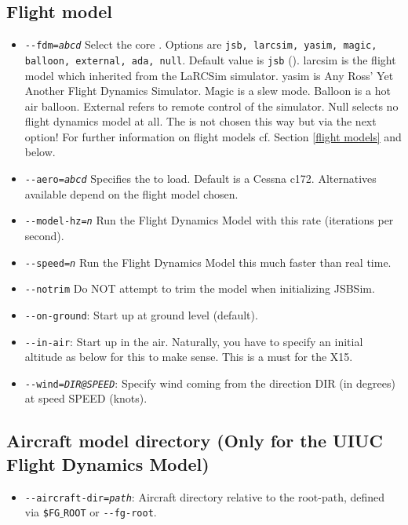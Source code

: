 \subsection{Flight model}\label{flight dynamics model}
\begin{itemize}
\item{\texttt{-$ $-fdm={\it abcd}}} Select the core .
Options are \texttt{jsb, larcsim, yasim, magic, balloon, external, ada, null}. Default value is
\texttt{jsb} (\JSBSim). larcsim is the flight model which \FlightGear{} inherited from the LaRCSim simulator. yasim is Any Ross' Yet Another Flight Dynamics Simulator. Magic is a slew mode. Balloon is a hot air balloon. External refers to remote control of the simulator. Null selects no flight dynamics model at all. The  is not chosen this way but via the next option! For further information on flight models cf. Section \ref{flight models} and below.
\item{\texttt{-$ $-aero={\it abcd}}} Specifies the  to load. Default is a Cessna c172. Alternatives available depend on the flight model chosen. 
\item{\texttt{-$ $-model-hz={\it n}}} Run the Flight Dynamics Model with this rate
(iterations per second).
\item{\texttt{-$ $-speed={\it n}}} Run the Flight Dynamics Model this much faster than real
time.
\item{\texttt{-$ $-notrim}} Do NOT attempt to trim the model when initializing JSBSim.
\item{\texttt{-$ $-on-ground}}: Start up at ground level (default).
\item{\texttt{-$ $-in-air}}: Start up in the air. Naturally, you have to specify an
initial altitude as below for this to make sense. This is a must for the X15.
\item{\texttt{-$ $-wind={\it DIR@SPEED}}}: Specify wind coming from the direction DIR (in
degrees) at speed SPEED (knots).
\end{itemize}
\subsection{Aircraft model directory (Only for the UIUC Flight Dynamics Model)}
\begin{itemize}
\item{\texttt{-$ $-aircraft-dir={\it path}}}: Aircraft directory relative to the
 root-path, defined via \texttt{{\$}FG$\_$ROOT} or \texttt{-$ $-fg-root}.
\end{itemize}

